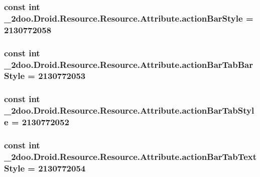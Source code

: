 \hypertarget{class__2doo_1_1_droid_1_1_resource_1_1_attribute_ca8d6c2c8f1d77d4b023469362e794e6}{
\subsubsection[{actionBarStyle}]{\setlength{\rightskip}{0pt plus 5cm}const int \_\-2doo.Droid.Resource.Resource.Attribute.actionBarStyle = 2130772058}}
\label{class__2doo_1_1_droid_1_1_resource_1_1_attribute_ca8d6c2c8f1d77d4b023469362e794e6}


\hypertarget{class__2doo_1_1_droid_1_1_resource_1_1_attribute_97f1f887f9a9c9386ef91d4c5e865d26}{
\subsubsection[{actionBarTabBarStyle}]{\setlength{\rightskip}{0pt plus 5cm}const int \_\-2doo.Droid.Resource.Resource.Attribute.actionBarTabBarStyle = 2130772053}}
\label{class__2doo_1_1_droid_1_1_resource_1_1_attribute_97f1f887f9a9c9386ef91d4c5e865d26}


\hypertarget{class__2doo_1_1_droid_1_1_resource_1_1_attribute_5e0937b0556820fb8374ab519a87e38d}{
\subsubsection[{actionBarTabStyle}]{\setlength{\rightskip}{0pt plus 5cm}const int \_\-2doo.Droid.Resource.Resource.Attribute.actionBarTabStyle = 2130772052}}
\label{class__2doo_1_1_droid_1_1_resource_1_1_attribute_5e0937b0556820fb8374ab519a87e38d}


\hypertarget{class__2doo_1_1_droid_1_1_resource_1_1_attribute_52f7e3baaad0c8fbe2807141d866bb7f}{
\subsubsection[{actionBarTabTextStyle}]{\setlength{\rightskip}{0pt plus 5cm}const int \_\-2doo.Droid.Resource.Resource.Attribute.actionBarTabTextStyle = 2130772054}}
\label{class__2doo_1_1_droid_1_1_resource_1_1_attribute_52f7e3baaad0c8fbe2807141d866bb7f}


